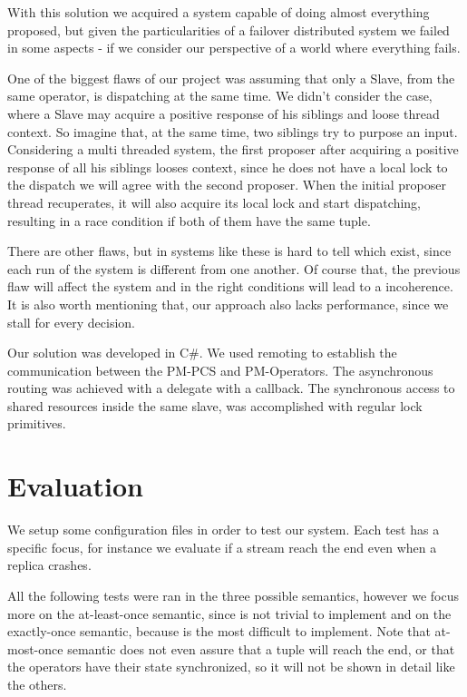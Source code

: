 \documentclass[times, 10pt,twocolumn]{article}
\begin{document}
With this solution we acquired a system capable of doing almost everything proposed, but given the particularities of a failover distributed system we failed in some aspects - if we consider our perspective of a world where everything fails. 

One of the biggest flaws of our project was assuming that only a Slave, from the same operator, is dispatching at the same time. We didn't consider the case, where a Slave may acquire a positive response of his siblings and loose thread context. So imagine that, at the same time, two siblings try to purpose an input. Considering a multi threaded system, the first proposer after acquiring a positive response of all his siblings looses context, since he does not have a local lock to the dispatch we will agree with the second proposer. When the initial proposer thread recuperates, it will also acquire its local lock and start dispatching, resulting in a race condition if both of them have the same tuple.

There are other flaws, but in systems like these is hard to tell which exist, since each run of the system is different from one another. Of course that, the previous flaw will affect the system and in the right conditions will lead to a incoherence. It is also worth mentioning that, our approach also lacks performance, since we stall for every decision.


Our solution was developed in C\#. We used remoting to establish the communication between the PM-PCS and PM-Operators. The asynchronous routing was achieved with a delegate with a callback. The synchronous access to shared resources inside the same slave, was accomplished with regular lock primitives.

\section{Evaluation}

We setup some configuration files in order to test our system. Each test 
has a specific focus, for instance we evaluate if a stream reach the end even when 
a replica crashes.

All the following tests were ran in the three possible semantics, however we focus more on the at-least-once semantic, since is not trivial to implement and on the exactly-once semantic, because is the most difficult to implement. Note that at-most-once semantic does not even assure that a tuple will reach the end, or that the operators have their state synchronized, so it will not be shown in detail like the others. 
\end{document}
